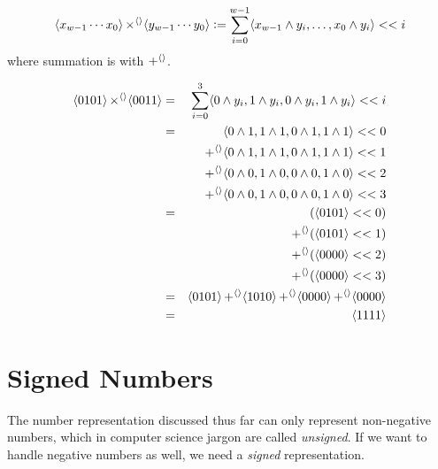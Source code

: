 \begin{definition}
\begin{align*}
  \langle x_{w-1}\cdots{}x_{0} \rangle \operatorname{\times^{\langle\rangle}} \langle y_{w-1}\cdots{}y_{0} \rangle \vcentcolon=
  \sum_{i=0}^{w-1} \langle x_{w-1} \land y_{i},\ldots,x_{0} \land y_{i} \rangle << i
\end{align*}
where summation is with $\operatorname{+^{\langle\rangle}}$.
\end{definition}

\begin{example}[$5 \times 3$]
  \begin{align}
    \langle 0101 \rangle \operatorname{\times^{\langle\rangle}} \langle 0011 \rangle &=& \sum_{i=0}^{3} \langle 0 \land y_{i},1\land y_{i}, 0\land y_{i}, 1 \land y_{i} \rangle << i \\
                                              &=& \langle 0 \land 1,1\land 1, 0\land 1, 1 \land 1 \rangle << 0 \\\nonumber
                                              &&\operatorname{+^{\langle\rangle}} \langle 0 \land 1,1\land 1, 0\land 1, 1 \land 1 \rangle << 1 \\\nonumber
                                              &&\operatorname{+^{\langle\rangle}} \langle 0 \land 0,1\land 0, 0\land 0, 1 \land 0 \rangle << 2 \\\nonumber
                                              &&\operatorname{+^{\langle\rangle}} \langle 0 \land 0,1\land 0, 0\land 0, 1 \land 0 \rangle << 3 \\
                                              &=&         (\langle 0101 \rangle << 0) \\\nonumber
                                              &&\operatorname{+^{\langle\rangle}} (\langle 0101 \rangle << 1) \\\nonumber
                                              && \operatorname{+^{\langle\rangle}} (\langle 0000 \rangle << 2) \\\nonumber
                                              && \operatorname{+^{\langle\rangle}} (\langle 0000 \rangle << 3) \\
                                              &=& \langle 0101 \rangle \operatorname{+^{\langle\rangle}} \langle 1010 \rangle \operatorname{+^{\langle\rangle}} \langle 0000 \rangle  \operatorname{+^{\langle\rangle}} \langle 0000 \rangle \\
    &=& \langle 1111 \rangle
  \end{align}
\end{example}

\section{Signed Numbers}
\label{sec:signed-numbers}

The number representation discussed thus far can only represent
non-negative numbers, which in computer science jargon are called
\emph{unsigned}.  If we want to handle negative numbers as well, we
need a \emph{signed} representation.

